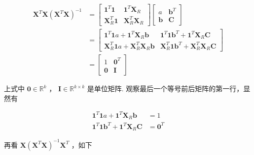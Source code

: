 \documentclass[UTF8]{ctexart}
\begin{document}
    \begin{equation}
    	\begin{aligned}
    		\boldsymbol{X}^T \boldsymbol{X} (\boldsymbol{X}^T \boldsymbol{X})^{-1} & = \begin{bmatrix}
    			\boldsymbol{1}^T \boldsymbol{1} & \boldsymbol{1}^T \boldsymbol{X}_R \\
    			\boldsymbol{X}_R^T \boldsymbol{1} & \boldsymbol{X}_R^T \boldsymbol{X}_R
    		\end{bmatrix} \begin{bmatrix}
    		    a & \boldsymbol{b}^T \\
    		    \boldsymbol{b} & \boldsymbol{C}
    		\end{bmatrix} \\
    	    & = \begin{bmatrix}
    	    	\boldsymbol{1}^T \boldsymbol{1} a + \boldsymbol{1}^T \boldsymbol{X}_R \boldsymbol{b} & \boldsymbol{1}^T \boldsymbol{1} \boldsymbol{b}^T + \boldsymbol{1}^T \boldsymbol{X}_R \boldsymbol{C} \\
    	    	\boldsymbol{X}_R^T \boldsymbol{1} a + \boldsymbol{X}_R^T \boldsymbol{X}_R \boldsymbol{b} & \boldsymbol{X}_R^T \boldsymbol{1} \boldsymbol{b}^T + \boldsymbol{X}_R^T \boldsymbol{X}_R \boldsymbol{C}
    	    \end{bmatrix} \\
            & = \begin{bmatrix}
            	1 & \boldsymbol{0}^T \\
            	\boldsymbol{0} & \boldsymbol{I}
            \end{bmatrix}
    	\end{aligned}
    \end{equation}

    上式中 $ \boldsymbol{0} \in \mathbb{R}^k $ ， $ \boldsymbol{I} \in \mathbb{R}^{k \times k} $ 是单位矩阵. 观察最后一个等号前后矩阵的第一行，显然有
    
    \begin{equation}
    	\begin{aligned}
    		\boldsymbol{1}^T \boldsymbol{1} a + \boldsymbol{1}^T \boldsymbol{X}_R \boldsymbol{b} & = 1 \\
    		\boldsymbol{1}^T \boldsymbol{1} \boldsymbol{b}^T + \boldsymbol{1}^T \boldsymbol{X}_R \boldsymbol{C} & = \boldsymbol{0}^T
    	\end{aligned}
    \end{equation}

    再看 $ \boldsymbol{X} (\boldsymbol{X}^T \boldsymbol{X})^{-1} \boldsymbol{X}^T $ ，如下
    
\end{document}
